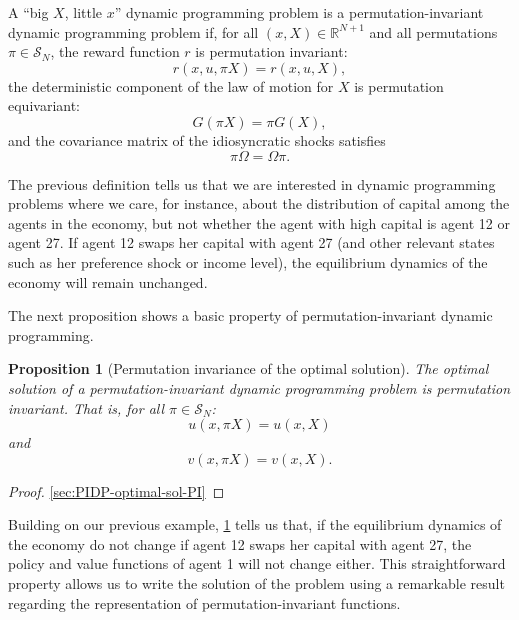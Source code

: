 \documentclass[12pt]{article}
\newtheorem{proposition}{Proposition}
\begin{document}
\begin{definition} \label{def:permutation-inv-dyn-prog}
A ``big $X$, little $x$'' dynamic programming problem is a permutation-invariant dynamic programming problem if, for all $(x,X)\in \mathbb{R}^{N+1}$ and all permutations $\pi \in \mathcal{S}_N$, the reward function $r$ is permutation invariant:
\begin{equation}
r(x,u,\pi X) = r(x,u,X),\label{eq:r-permutation-invariance}
\end{equation}	
the deterministic component of the law of motion for $X$ is permutation equivariant:
\begin{equation}
G(\pi X) = \pi G(X),\label{eq:G-permutation-equivariant}
\end{equation}
and the covariance matrix of the idiosyncratic shocks satisfies	
\begin{equation}
\pi \Omega = \Omega\pi.\label{eq:Omega-permutation-equivariant}
\end{equation}
\end{definition} 

The previous definition tells us that we are interested in dynamic programming problems where we care, for instance, about the distribution of capital among the agents in the economy, but not whether the agent with high capital is agent 12 or agent 27. If agent 12 swaps her capital with agent 27 (and other relevant states such as her preference shock or income level), the equilibrium dynamics of the economy will remain unchanged. 
	
The next proposition shows a basic property of permutation-invariant dynamic programming.

\begin{proposition}[Permutation invariance of the optimal solution]\label{prop:PIDP-optimal-sol-PI} 
The optimal solution of a permutation-invariant dynamic programming problem is permutation invariant. That is, for all $\pi \in \mathcal{S}_N$: 
\begin{equation}
u(x,\pi X) = u(x,X)
\end{equation} 
and 
\begin{equation}
v(x,\pi X) = v(x,X).
\end{equation}
\end{proposition}
\begin{proof}
\cref{sec:PIDP-optimal-sol-PI}
\end{proof}

Building on our previous example, \cref{prop:PIDP-optimal-sol-PI} tells us that, if the equilibrium dynamics of the economy do not change if agent 12 swaps her capital with agent 27, the policy and value functions of agent 1 will not change either. This straightforward property allows us to write the solution of the problem using a remarkable result regarding the representation of permutation-invariant functions.
\end{document}
